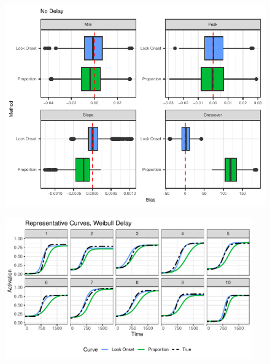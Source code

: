 \documentclass{beamer}
\begin{document}
\begin{frame}
\begin{figure}[H]
\centering
\includegraphics{no_delay_bar_plot.pdf}
\end{figure}
\end{frame}



\begin{frame}
\begin{figure}[H]
\centering
\includegraphics[width=0.95\textwidth]{rep_curves_weibull_delay.pdf}
\end{figure}
\end{frame}
\end{document}
